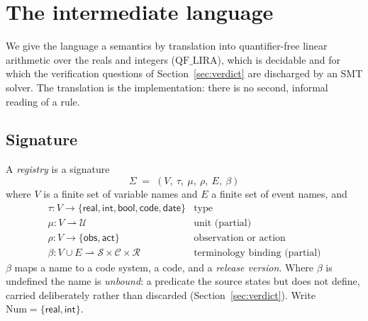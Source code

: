 %
%
%
%

\section{The intermediate language}
\label{sec:dsl}

We give the language a semantics by translation into quantifier-free linear
arithmetic over the reals and integers ($\mathrm{QF\_LIRA}$), which is decidable
and for which the verification questions of Section~\ref{sec:verdict} are
discharged by an SMT solver. The translation is the implementation: there is no
second, informal reading of a rule.

\subsection{Signature}

A \emph{registry} is a signature
\[
  \Sigma \;=\; (V,\ \tau,\ \mu,\ \rho,\ E,\ \beta)
\]
where $V$ is a finite set of variable names and $E$ a finite set of event names,
and
\[
\begin{array}{ll}
  \tau : V \to \{\mathsf{real},\mathsf{int},\mathsf{bool},\mathsf{code},\mathsf{date}\}
    & \text{type} \\
  \mu : V \rightharpoonup \mathcal{U}
    & \text{unit (partial)} \\
  \rho : V \to \{\mathsf{obs},\mathsf{act}\}
    & \text{observation or action} \\
  \beta : V \cup E \rightharpoonup \mathcal{S}\times\mathcal{C}\times\mathcal{R}
    & \text{terminology binding (partial)}
\end{array}
\]
$\beta$ maps a name to a code system, a code, and a \emph{release version}.
Where $\beta$ is undefined the name is \emph{unbound}: a predicate the source
states but does not define, carried deliberately rather than discarded
(Section~\ref{sec:verdict}). Write $\mathrm{Num} = \{\mathsf{real},\mathsf{int}\}$.

